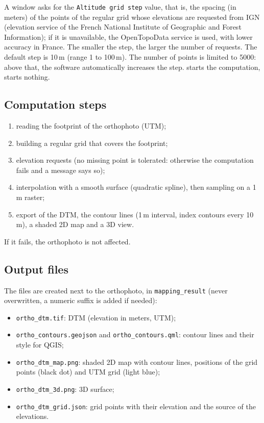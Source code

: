 \documentclass[a4paper,11pt]{report}
\DeclareRobustCommand{\bouton}[1]{\texorpdfstring{\fbox{\small\textsf{#1}}}{#1}}
\begin{document}
A window asks for the \texttt{Altitude grid step} value, that is, the spacing (in meters) of the points of the regular grid whose elevations are requested from IGN (elevation service of the French National Institute of Geographic and Forest Information); if it is unavailable, the OpenTopoData service is used, with lower accuracy in France. The smaller the step, the larger the number of requests. The default step is 10\,m (range 1 to 100\,m). The number of points is limited to 5000: above that, the software automatically increases the step. \bouton{Build} starts the computation, \bouton{Cancel} starts nothing.

\subsection*{Computation steps}
\begin{enumerate}
	\item reading the footprint of the orthophoto (UTM);
	\item building a regular grid that covers the footprint;
	\item elevation requests (no missing point is tolerated: otherwise the computation fails and a message says so);
	\item interpolation with a smooth surface (quadratic spline), then sampling on a 1\,m raster;
	\item export of the DTM, the contour lines (1\,m interval, index contours every 10\,m), a shaded 2D map and a 3D view.
\end{enumerate}
If it fails, the orthophoto is not affected.

\subsection{Output files}
The files are created next to the orthophoto, in \texttt{mapping\_result} (never overwritten, a numeric suffix is added if needed):
\begin{itemize}
	\item \texttt{ortho\_dtm.tif}: DTM (elevation in meters, UTM);
	\item \texttt{ortho\_contours.geojson} and \texttt{ortho\_contours.qml}: contour lines and their style for QGIS;
	\item \texttt{ortho\_dtm\_map.png}: shaded 2D map with contour lines, positions of the grid points (black dot) and UTM grid (light blue);
	\item \texttt{ortho\_dtm\_3d.png}: 3D surface;
	\item \texttt{ortho\_dtm\_grid.json}: grid points with their elevation and the source of the elevations.
\end{itemize}
\end{document}
